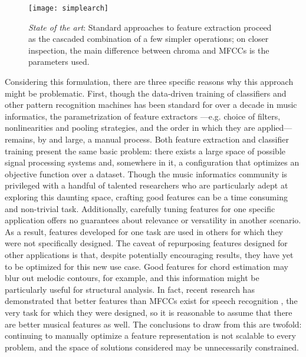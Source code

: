 \begin{figure}[t]
\begin{centering}
\texttt{[image: simplearch]}
\caption{\emph{State of the art}: Standard approaches to feature extraction proceed as the cascaded combination of a few simpler operations; on closer inspection, the main difference between chroma and MFCCs is the parameters used.}
\label{fig:simplearch}
\end{centering}
\end{figure}


Considering this formulation, there are three specific reasons why this approach might be problematic.
First, though the data-driven training of classifiers and other pattern recognition machines has been standard for over a decade in music informatics, the parametrization of feature extractors ---e.g. choice of filters, nonlinearities and pooling strategies, and the order in which they are applied--- remains, by and large, a manual process.
Both feature extraction and classifier training present the same basic problem: there exists a large space of possible signal processing systems and, somewhere in it, a configuration that optimizes an objective function over a dataset.
Though the music informatics community is privileged with a handful of talented researchers who are particularly adept at exploring this daunting space, crafting good features can be a time consuming and non-trivial task.
Additionally, carefully tuning features for one specific application offers no guarantees about relevance or versatility in another scenario.
As a result, features developed for one task are used in others for which they were not specifically designed.
The caveat of repurposing features designed for other applications is that, despite potentially encouraging results, they have yet to be optimized for this new use case.
Good features for chord estimation may blur out melodic contours, for example, and this information might be particularly useful for structural analysis.
In fact, recent research has demonstrated that better features than MFCCs exist for speech recognition \cite{Mohamed2011Deep}, the very task for which they were designed, so it is reasonable to assume that there are better musical features as well.
The conclusions to draw from this are twofold: continuing to manually optimize a feature representation is not scalable to every problem, and the space of solutions considered may be unnecessarily constrained.


